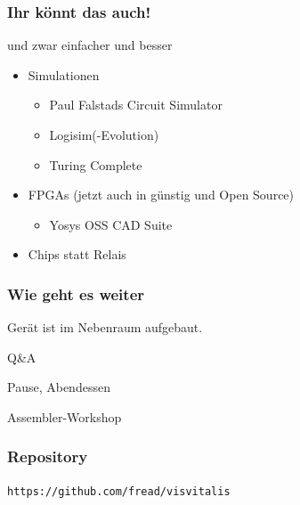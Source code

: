 \documentclass[t,aspectratio=169,usenames,dvipsnames]{beamer}
\begin{document}
\begin{frame}
  \frametitle{Ihr könnt das auch!}

  und zwar einfacher und besser
  \begin{itemize}
  \item Simulationen
    \begin{itemize}
    \item Paul Falstads Circuit Simulator
    \item Logisim(-Evolution)
    \item Turing Complete
    \end{itemize}
  \item FPGAs (jetzt auch in günstig und Open Source)
    \begin{itemize}
    \item Yosys OSS CAD Suite
    \end{itemize}
  \item Chips statt Relais
  \end{itemize}
\end{frame}

\begin{frame}
  \frametitle{Wie geht es weiter}

  Gerät ist im Nebenraum aufgebaut.

  \bigskip

  \begin{description}[ca. 20:00:]
  \item[Jetzt:] Q\&A
  \item[19:00:] Pause, Abendessen
  \item[ca. 20:00:] Assembler-Workshop
  \end{description}
\end{frame}

\begin{frame}
  \frametitle{Repository}
  \begin{center}
    \texttt{https://github.com/fread/visvitalis}

    \bigskip

  \end{center}
\end{frame}
\end{document}
